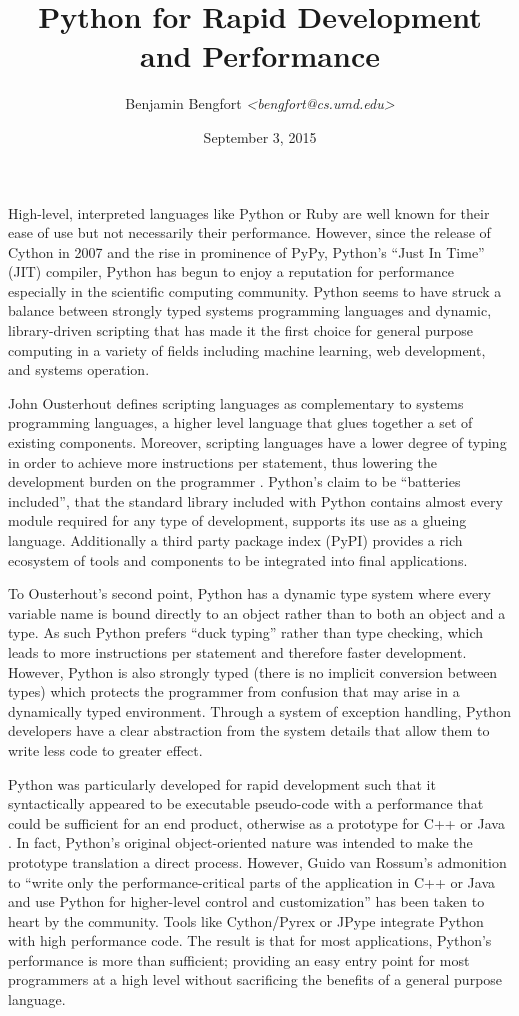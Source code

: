 \documentclass[11pt,letterpaper]{article}
\title{Python for Rapid Development and Performance}
\author{Benjamin Bengfort \textit{<bengfort@cs.umd.edu>}}
\date{September 3, 2015}
\begin{document}
\maketitle

High-level, interpreted languages like Python or Ruby are well known for their ease of use but not necessarily their performance. However, since the release of Cython in 2007 and the rise in prominence of PyPy, Python's ``Just In Time'' (JIT) compiler, Python has begun to enjoy a reputation for performance especially in the scientific computing community. Python seems to have struck a balance between strongly typed systems programming languages and dynamic, library-driven scripting that has made it the first choice for general purpose computing in a variety of fields including machine learning, web development, and systems operation.

John Ousterhout defines scripting languages as complementary to systems programming languages, a higher level language that glues together a set of existing components. Moreover, scripting languages have a lower degree of typing in order to achieve more instructions per statement, thus lowering the development burden on the programmer \cite{ousterhout1998scripting}. Python's claim to be ``batteries included'', that the standard library included with Python contains almost every module required for any type of development, supports its use as a glueing language. Additionally a third party package index (PyPI) provides a rich ecosystem of tools and components to be integrated into final applications.

To Ousterhout's second point, Python has a dynamic type system where every variable name is bound directly to an object rather than to both an object and a type. As such Python prefers ``duck typing'' rather than type checking, which leads to more instructions per statement and therefore faster development. However, Python is also strongly typed (there is no implicit conversion between types) which protects the programmer from confusion that may arise in a dynamically typed environment. Through a system of exception handling, Python developers have a clear abstraction from the system details that allow them to write less code to greater effect.

Python was particularly developed for rapid development such that it syntactically appeared to be executable pseudo-code with a performance that could be sufficient for an end product, otherwise as a prototype for C++ or Java \cite{rossum1998glue}. In fact, Python's original object-oriented nature was intended to make the prototype translation a direct process. However, Guido van Rossum's admonition to ``write only the performance-critical parts of the application in C++ or Java and use Python for higher-level control and customization'' has been taken to heart by the community. Tools like Cython/Pyrex or JPype integrate Python with high performance code. The result is that for most applications, Python's performance is more than sufficient; providing an easy entry point for most programmers at a high level without sacrificing the benefits of a general purpose language.



\end{document}
